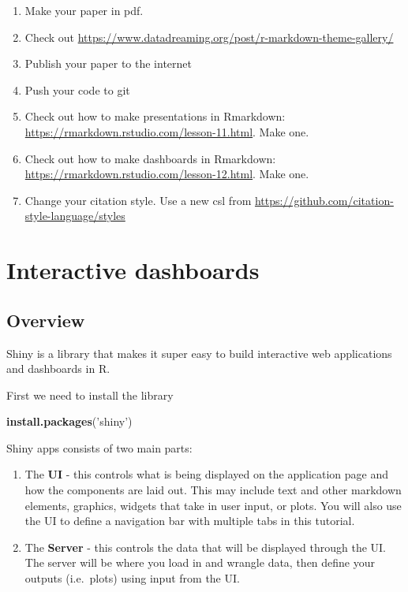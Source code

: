 \documentclass[
]{book}
\newenvironment{Shaded}{\begin{snugshade}}{\end{snugshade}}
\newcommand{\KeywordTok}[1]{\textcolor[rgb]{0.13,0.29,0.53}{\textbf{#1}}}
\newcommand{\NormalTok}[1]{#1}
\newcommand{\StringTok}[1]{\textcolor[rgb]{0.31,0.60,0.02}{#1}}
\begin{document}
\begin{enumerate}
\item
  Make your paper in pdf.
\item
  Check out \url{https://www.datadreaming.org/post/r-markdown-theme-gallery/}
\item
  Publish your paper to the internet
\item
  Push your code to git
\item
  Check out how to make presentations in Rmarkdown: \url{https://rmarkdown.rstudio.com/lesson-11.html}. Make one.
\item
  Check out how to make dashboards in Rmarkdown: \url{https://rmarkdown.rstudio.com/lesson-12.html}. Make one.
\item
  Change your citation style. Use a new csl from \url{https://github.com/citation-style-language/styles}
\end{enumerate}

\hypertarget{shiny}{%
\chapter{Interactive dashboards}\label{shiny}}

\hypertarget{overview}{%
\section*{Overview}\label{overview}}

Shiny is a library that makes it super easy to build interactive web applications and dashboards in R.

First we need to install the library

\begin{Shaded}
\begin{Highlighting}[]
\KeywordTok{install.packages}\NormalTok{(}\StringTok{'shiny'}\NormalTok{)}
\end{Highlighting}
\end{Shaded}

Shiny apps consists of two main parts:

\begin{enumerate}
\def\labelenumi{\arabic{enumi})}
\item
  The \textbf{UI} - this controls what is being displayed on the application page and how the components are laid out. This may include text and other markdown elements, graphics, widgets that take in user input, or plots. You will also use the UI to define a navigation bar with multiple tabs in this tutorial.
\item
  The \textbf{Server} - this controls the data that will be displayed through the UI. The server will be where you load in and wrangle data, then define your outputs (i.e.~plots) using input from the UI.
\end{enumerate}
\end{document}
